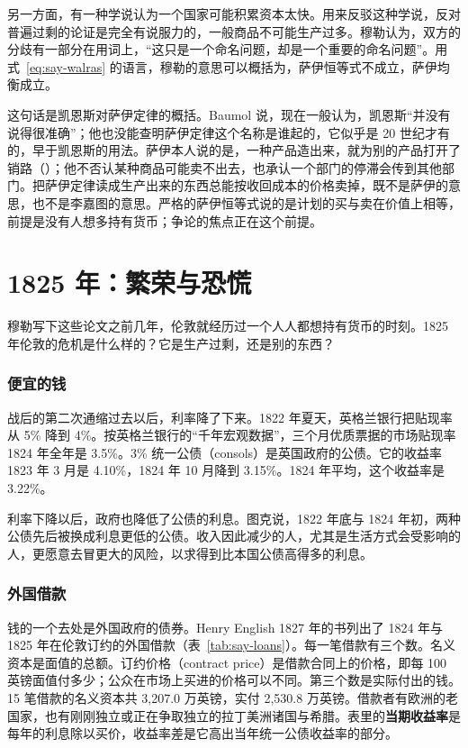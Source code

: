 另一方面，有一种学说认为一个国家可能积累资本太快。用来反驳这种学说，反对普遍过剩的论证是完全有说服力的，一般商品不可能生产过多\cite{jsmill1844}。穆勒认为，双方的分歧有一部分在用词上，“这只是一个命名问题，却是一个重要的命名问题”\cite{jsmill1844}。用式~\eqref{eq:say-walras} 的语言，穆勒的意思可以概括为，萨伊恒等式不成立，萨伊均衡成立。

\begin{pitfall}
这句话是凯恩斯对萨伊定律的概括。Baumol 说，现在一般认为，凯恩斯“并没有说得很准确”；他也没能查明萨伊定律这个名称是谁起的，它似乎是 20 世纪才有的，早于凯恩斯的用法\cite{baumol1999}。萨伊本人说的是，一种产品造出来，就为别的产品打开了销路（）；他不否认某种商品可能卖不出去，也承认一个部门的停滞会传到其他部门。把萨伊定律读成生产出来的东西总能按收回成本的价格卖掉，既不是萨伊的意思，也不是李嘉图的意思。严格的萨伊恒等式说的是计划的买与卖在价值上相等，前提是没有人想多持有货币；争论的焦点正在这个前提。
\end{pitfall}

\section{1825 年：繁荣与恐慌}\label{sec:say-1825}

穆勒写下这些论文之前几年，伦敦就经历过一个人人都想持有货币的时刻。1825 年伦敦的危机是什么样的？它是生产过剩，还是别的东西？

\subsubsection{便宜的钱}
战后的第二次通缩过去以后，利率降了下来。1822 年夏天，英格兰银行把贴现率从 5\% 降到 4\%\cite{tooke1838v2}。按英格兰银行的“千年宏观数据”，三个月优质票据的市场贴现率 1824 年全年是 3.5\%。3\% 统一公债（consols）是英国政府的公债。它的收益率 1823 年 3 月是 4.10\%，1824 年 10 月降到 3.15\%。1824 年平均，这个收益率是 3.22\%\cite{boe2017}。

利率下降以后，政府也降低了公债的利息。图克说，1822 年底与 1824 年初，两种公债先后被换成利息更低的公债。收入因此减少的人，尤其是生活方式会受影响的人，更愿意去冒更大的风险，以求得到比本国公债高得多的利息\cite{tooke1838v2}。

\subsubsection{外国借款}
钱的一个去处是外国政府的债券。Henry English 1827 年的书列出了 1824 年与 1825 年在伦敦订约的外国借款（表~\ref{tab:say-loans}）\cite{english1827}。每一笔借款有三个数。名义资本是面值的总额。订约价格（contract price）是借款合同上的价格，即每 100 英镑面值付多少；公众在市场上买进的价格可以不同。第三个数是实际付出的钱。15 笔借款的名义资本共 3,207.0 万英镑，实付 2,530.8 万英镑\cite{english1827}。借款者有欧洲的老国家，也有刚刚独立或正在争取独立的拉丁美洲诸国与希腊。表里的\textbf{当期收益率}是每年的利息除以买价，收益率差是它高出当年统一公债收益率的部分。

